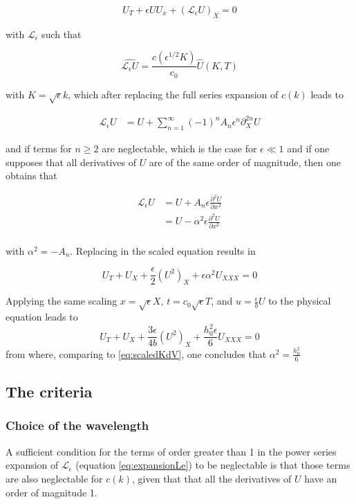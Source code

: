 $$ U_T + \epsilon U U_x+(\mathcal{L}_{\epsilon} U)_{X} = 0$$

\noindent with $\mathcal{L}_\epsilon$ such that 

$$ \widehat{\mathcal{L}_\epsilon U} = \frac{c(\epsilon^{1/2} K)}{c_0} \hat{U}(K,T)$$ 

\noindent with $K=\sqrt{\epsilon} k$, which after replacing the full series expansion of $c(k)$ leads to

\begin{align}
  \label{eq:expansionLe}
    \mathcal{L}_\epsilon U &=U +\sum_{n=1}^\infty (-1)^n A_n \epsilon^n \partial_X^{2n} U    
\end{align}

\noindent and if terms for $n\geq2$ are neglectable, which is the case for $\epsilon \ll 1 $ and if one supposes that all derivatives of $U$ are of the same order of magnitude, then one obtains that

\begin{align*}
    \mathcal{L}_\epsilon U &= U + A_n \epsilon \frac{\partial^2 U}{\partial x^2} \\
    &= U - \alpha^2 \epsilon \frac{\partial^2 U}{\partial x^2} \\
\end{align*}

\noindent with $\alpha^2 = - A_n$. Replacing in the scaled equation results in

$$U_T + U_X + \frac{\epsilon}{2} (U^2)_X + \epsilon\alpha^2U_{XXX} = 0$$

\indent Applying the same scaling $x=\sqrt{\epsilon} X$, $t =c_0 \sqrt{\epsilon} T$, and $u = \frac{\epsilon}{ b} U$ to the physical equation leads to $$U_T + U_X + \frac{3\epsilon}{4b} (U^2)_X + \frac{h_0^2\epsilon}{6}U_{XXX} = 0$$
from where, comparing to \eqref{eq:scaledKdV}, one concludes that $ \alpha^2 = \frac{h_0^2}{6} $

\subsection{The criteria}

\subsubsection{Choice of the wavelength}

\indent A sufficient condition for the terms of order greater than 1 in the power series expansion of $\mathcal{L}_\epsilon$  (equation \eqref{eq:expansionLe}) to be neglectable is that those terms are also neglectable for $c(k)$, given that that all the derivatives of $U$ have an order of magnitude 1.

